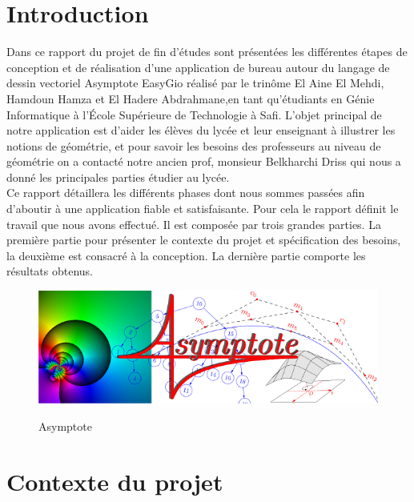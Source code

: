 \documentclass[a4paper]{report}
\begin{document}
\chapter*{Introduction}
Dans ce rapport du projet de fin d'études sont présentées les différentes étapes de conception et de réalisation d’une application de bureau autour du langage de dessin vectoriel Asymptote EasyGio réalisé par le trinôme El Aine El Mehdi, Hamdoun Hamza et El Hadere Abdrahmane,en tant qu’étudiants en Génie Informatique à l’École Supérieure de Technologie à Safi. L'objet principal de notre application est d'aider les élèves du lycée et leur enseignant à illustrer les notions de géométrie, et pour savoir les besoins des professeurs au niveau de géométrie on a contacté notre ancien prof, monsieur Belkharchi Driss qui nous a donné les principales parties étudier au lycée.\\
Ce rapport détaillera les différents phases dont nous sommes passées afin d'aboutir à une application fiable et satisfaisante. Pour cela le rapport définit le travail que nous avons effectué. Il est composée par trois grandes parties. La première partie pour présenter le contexte du projet et spécification des besoins, la deuxième est consacré à la conception. La dernière partie comporte les résultats obtenus.\\[0.4cm]
    \begin{figure}[!h] 
        \centering       
        \includegraphics[width=15cm]{images/asymptote.png}\\ \caption{Asymptote} \label{Asymptote} 
    \end{figure}
\chapter{Contexte du projet}
\end{document}
